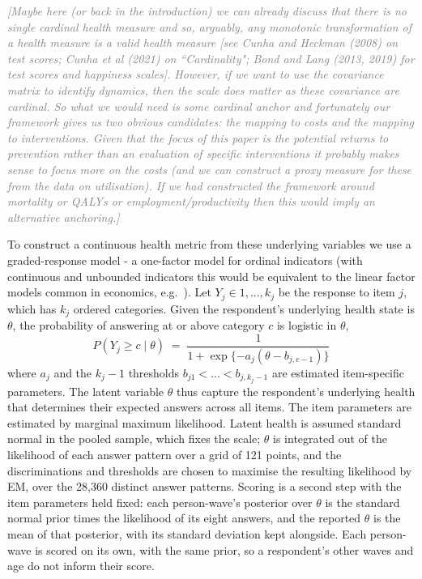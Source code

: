 \documentclass[11pt]{article}
\newcommand{\note}[1]{\textcolor{gray}{\textit{[#1]}}}
\begin{document}
	\note{Maybe here (or back in the introduction) we can already discuss that there is no single cardinal health measure and so, arguably, any monotonic transformation of a health measure is a valid health measure [see Cunha and Heckman (2008) on test scores; Cunha et al (2021) on ``Cardinality"; Bond and Lang (2013, 2019) for test scores and happiness scales]. However, if we want to use the covariance matrix to identify dynamics, then the scale does matter as these covariance are cardinal. So what we would need is some cardinal anchor and fortunately our framework gives us two obvious candidates: the mapping to costs and the mapping to interventions. Given that the focus of this paper is the potential returns to prevention rather than an evaluation of specific interventions it probably makes sense to focus more on the costs (and we can construct a proxy measure for these from the data on utilisation). If we had constructed the framework around mortality or QALYs or employment/productivity then this would imply an alternative anchoring.}

	To construct a continuous health metric from these underlying variables we use a graded-response model \cite{samejima1969} - a one-factor model for ordinal indicators (with continuous and unbounded indicators this would be equivalent to the linear factor models common in economics, e.g.\ \citealp{cunha2010,attanasio2020,agostinelli2025}). Let $Y_j \in {1,...,k_j}$ be the response to item $j$, which has $k_j$ ordered categories. Given the respondent's underlying health state is $\theta$, the probability of answering at or above category $c$ is logistic in $\theta$,
	\begin{equation}
			P(Y_j \ge c \mid \theta) \;=\; \frac{1}{1 + \exp\{-a_j(\theta - b_{j,c-1})\}}
	\end{equation}
	where $a_j$ and the $k_j-1$ thresholds $b_{j1} < \dots < b_{j,k_j-1}$ are estimated item-specific parameters. The latent variable $\theta$ thus capture the respondent's underlying health that determines their expected answers across all items. The item parameters are estimated by marginal maximum likelihood. Latent health is assumed standard normal in the pooled sample, which fixes the scale; $\theta$ is integrated out of the likelihood of each answer pattern over a grid of 121 points, and the discriminations and thresholds are chosen to maximise the resulting likelihood by EM, over the 28,360 distinct answer patterns. Scoring is a second step with the item parameters held fixed: each person-wave's posterior over $\theta$ is the standard normal prior times the likelihood of its eight answers, and the reported $\theta$ is the mean of that posterior, with its standard deviation kept alongside. Each person-wave is scored on its own, with the same prior, so a respondent's other waves and age do not inform their score.
	
\end{document}
